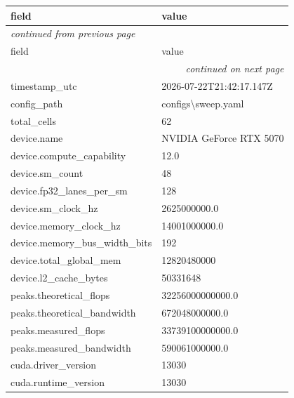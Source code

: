 \begin{longtable}{ll}
\toprule
field & value \\
\midrule
\endfirsthead
\multicolumn{2}{l}{\small\itshape continued from previous page} \\
\toprule
field & value \\
\midrule
\endhead
\midrule
\multicolumn{2}{r}{\small\itshape continued on next page} \\
\endfoot
\bottomrule
\endlastfoot
timestamp\_utc & 2026-07-22T21:42:17.147Z \\
config\_path & configs\textbackslash{}sweep.yaml \\
total\_cells & 62 \\
device.name & NVIDIA GeForce RTX 5070 \\
device.compute\_capability & 12.0 \\
device.sm\_count & 48 \\
device.fp32\_lanes\_per\_sm & 128 \\
device.sm\_clock\_hz & 2625000000.0 \\
device.memory\_clock\_hz & 14001000000.0 \\
device.memory\_bus\_width\_bits & 192 \\
device.total\_global\_mem & 12820480000 \\
device.l2\_cache\_bytes & 50331648 \\
peaks.theoretical\_flops & 32256000000000.0 \\
peaks.theoretical\_bandwidth & 672048000000.0 \\
peaks.measured\_flops & 33739100000000.0 \\
peaks.measured\_bandwidth & 590061000000.0 \\
cuda.driver\_version & 13030 \\
cuda.runtime\_version & 13030 \\
\end{longtable}
